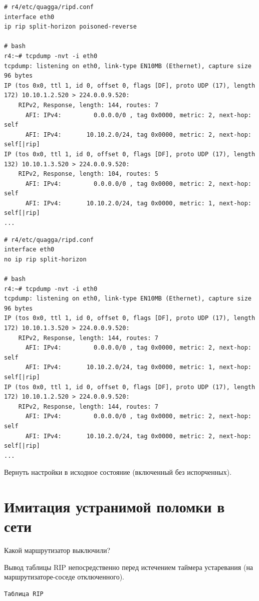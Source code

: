 \documentclass[a4paper,12pt]{article}
\begin{document}
\begin{Verbatim}
# r4/etc/quagga/ripd.conf
interface eth0
ip rip split-horizon poisoned-reverse

# bash
r4:~# tcpdump -nvt -i eth0
tcpdump: listening on eth0, link-type EN10MB (Ethernet), capture size 96 bytes
IP (tos 0x0, ttl 1, id 0, offset 0, flags [DF], proto UDP (17), length 172) 10.10.1.2.520 > 224.0.0.9.520: 
	RIPv2, Response, length: 144, routes: 7
	  AFI: IPv4:         0.0.0.0/0 , tag 0x0000, metric: 2, next-hop: self
	  AFI: IPv4:       10.10.2.0/24, tag 0x0000, metric: 2, next-hop: self[|rip]
IP (tos 0x0, ttl 1, id 0, offset 0, flags [DF], proto UDP (17), length 132) 10.10.1.3.520 > 224.0.0.9.520: 
	RIPv2, Response, length: 104, routes: 5
	  AFI: IPv4:         0.0.0.0/0 , tag 0x0000, metric: 2, next-hop: self
	  AFI: IPv4:       10.10.2.0/24, tag 0x0000, metric: 1, next-hop: self[|rip]
...
\end{Verbatim}

\begin{Verbatim}
# r4/etc/quagga/ripd.conf
interface eth0
no ip rip split-horizon

# bash
r4:~# tcpdump -nvt -i eth0
tcpdump: listening on eth0, link-type EN10MB (Ethernet), capture size 96 bytes
IP (tos 0x0, ttl 1, id 0, offset 0, flags [DF], proto UDP (17), length 172) 10.10.1.3.520 > 224.0.0.9.520: 
	RIPv2, Response, length: 144, routes: 7
	  AFI: IPv4:         0.0.0.0/0 , tag 0x0000, metric: 2, next-hop: self
	  AFI: IPv4:       10.10.2.0/24, tag 0x0000, metric: 1, next-hop: self[|rip]
IP (tos 0x0, ttl 1, id 0, offset 0, flags [DF], proto UDP (17), length 172) 10.10.1.2.520 > 224.0.0.9.520: 
	RIPv2, Response, length: 144, routes: 7
	  AFI: IPv4:         0.0.0.0/0 , tag 0x0000, metric: 2, next-hop: self
	  AFI: IPv4:       10.10.2.0/24, tag 0x0000, metric: 2, next-hop: self[|rip]
...
\end{Verbatim}

Вернуть настройки в исходное состояние (включенный без испорченных).


\section{Имитация устранимой поломки в сети}

Какой маршрутизатор выключили?

Вывод таблицы RIP непосредственно перед истечением таймера устаревания (на маршрутизаторе-соседе отключенного).

\begin{Verbatim}
Таблица RIP
\end{Verbatim}
\end{document}
